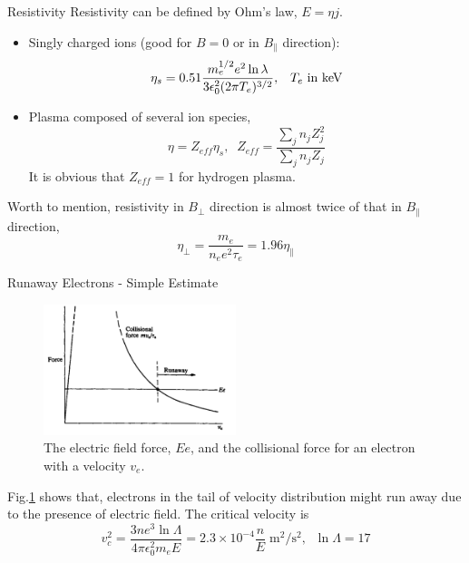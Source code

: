 \begin{frame}{Resistivity}
    Resistivity can be defined by Ohm's law, $E=\eta j$.
    \begin{itemize}
        \item Singly charged ions (good for $B=0$ or in $B_\parallel$ direction):
              \begin{equation}
                  \eta_s = 0.51\frac{m_e^{1/2}e^2\ln\lambda}{3\epsilon_0^2(2\pi T_e)^{3/2}}, \;\;\;\text{$T_e$ in \unit{\kilo\eV}}
                  \label{eq:resistivity-singly-charged-ion}
              \end{equation}
        \item Plasma composed of several ion species,
              \[ \eta = Z_{eff}\eta_s, \;\; Z_{eff} = \frac{\sum_j n_jZ_j^2}{\sum_j n_jZ_j} \]
              It is obvious that $Z_{eff}=1$ for hydrogen plasma.
    \end{itemize}
    Worth to mention, resistivity in $B_\perp$ direction is almost twice of that in $B_\parallel$ direction,
    \[ \eta_\perp = \frac{m_e}{n_ee^2\tau_e} = 1.96\eta_\parallel \]
\end{frame}

\begin{frame}{Runaway Electrons - Simple Estimate}
    \begin{figure}
        \centering
        \includegraphics[width=0.5\textwidth]{figures/runaway-electrons.png}
        \caption{The electric field force, $Ee$, and the collisional force for an electron with a velocity $v_e$.}
        \label{fig:runaway-electrons}
    \end{figure}
    Fig.\ref{fig:runaway-electrons} shows that, electrons in the tail of velocity distribution might run away due to the presence of electric field. The critical velocity is
    \begin{equation}
        v_c^2 = \frac{3ne^3\ln\Lambda}{4\pi\epsilon_0^2m_eE} = 2.3\times10^{-4}\frac{n}{E}\; \unit{\m\tothe{2}\per\s\tothe{2}}, \;\; \ln\Lambda=17
        \label{eq:critical-velocity}
    \end{equation}
\end{frame}
